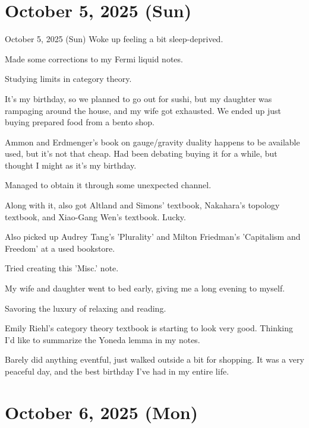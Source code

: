 \documentclass[dvipdfmx, autodetect-engine, aspectratio=169, 10.5pt]{beamer}
\begin{document}
\section{October 5, 2025 (Sun)}

\begin{frame}{October 5, 2025 (Sun)}
\scriptsize
Woke up feeling a bit sleep-deprived.

Made some corrections to my Fermi liquid notes.

Studying limits in category theory.

It's my birthday, so we planned to go out for sushi, but my daughter was rampaging around the house, and my wife got exhausted. We ended up just buying prepared food from a bento shop.

Ammon and Erdmenger's book on gauge/gravity duality happens to be available used, but it's not that cheap.
Had been debating buying it for a while, but thought I might as it's my birthday.

Managed to obtain it through some unexpected channel.

Along with it, also got Altland and Simons' textbook, Nakahara's topology textbook, and Xiao-Gang Wen's textbook. Lucky.

Also picked up Audrey Tang's 'Plurality' and Milton Friedman's 'Capitalism and Freedom' at a used bookstore.

Tried creating this 'Misc.' note.

My wife and daughter went to bed early, giving me a long evening to myself.

Savoring the luxury of relaxing and reading.

Emily Riehl's category theory textbook is starting to look very good.
Thinking I'd like to summarize the Yoneda lemma in my notes.

Barely did anything eventful, just walked outside a bit for shopping. It was a very peaceful day, and the best birthday I've had in my entire life.
\end{frame}

\section{October 6, 2025 (Mon)}
\end{document}
